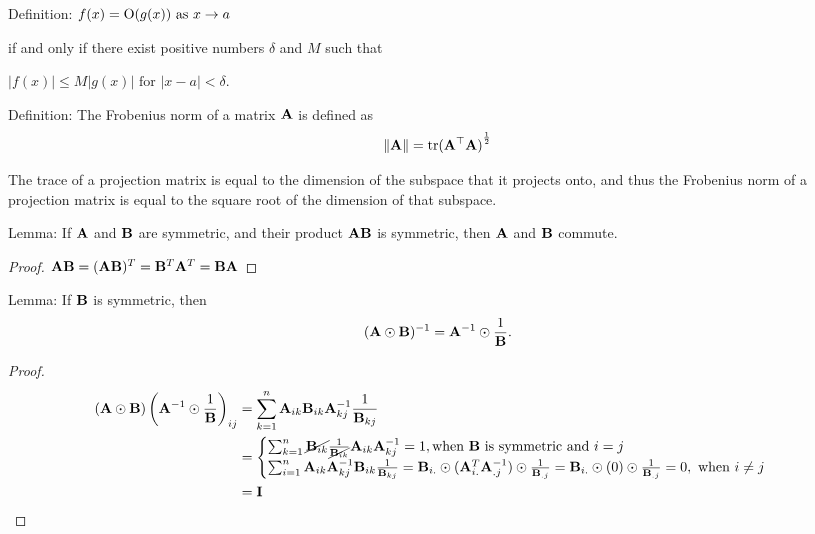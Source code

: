 \documentclass{amsart}[12pt]
\begin{document}
Definition:
$f(x) = \text{O}(g(x)) \text{ as } x \to a$

if and only if there exist positive numbers $\delta$ and $M$ such that

$|f(x)| \leq M |g(x)| \text{ for } |x - a| < \delta$.

Definition:
The Frobenius norm of a matrix ${\bf A}$ is defined as
\begin{align*}
\| {\bf A} \| = \text{tr}{({\bf A}^\top {\bf A})}^{\frac{1}{2}}
\end{align*}

The trace of a projection matrix is equal to the dimension of the subspace that it projects onto, and thus
the Frobenius norm of a projection matrix is equal to the square root of the dimension of that subspace.

Lemma:
If ${\bf A}$ and ${\bf B}$ are symmetric, and their product ${\bf A} {\bf B}$ is symmetric, then ${\bf A}$ and ${\bf B}$ commute.
\begin{proof}
${\bf A} {\bf B} = ({\bf A} {\bf B})^T = {\bf B}^T {\bf A}^T = {\bf B} {\bf A}$
\end{proof}

Lemma:
If ${\bf B}$ is symmetric, then
\[
({\bf A} \odot {\bf B})^{-1} = {\bf A}^{-1} \odot \frac{1}{{\bf B}}.
\]
\begin{proof}
\begin{align*}
({\bf A} \odot {\bf B})\left({\bf A}^{-1} \odot \frac{1}{{\bf B}}\right)_{ij} &= \sum_{k=1}^n {\bf A}_{ik} {\bf B}_{ik} {\bf A}^{-1}_{kj} \frac{1}{{\bf B}_{kj}} \\
&=
\begin{cases}
\sum_{k=1}^n \cancel{{\bf B}_{ik}} \frac{1}{\cancel{{\bf B}_{ik}}} {\bf A}_{ik} {\bf A}^{-1}_{kj} = 1, \text{when ${\bf B}$ is symmetric and $i = j$} \\
\sum_{i=1}^n {\bf A}_{ik} {\bf A}^{-1}_{kj} {\bf B}_{ik} \frac{1}{{\bf B}_{kj}}
= {\bf B}_{i.} \odot ({\bf A}^T_{i.} {\bf A}^{-1}_{.j}) \odot \frac{1}{{\bf B}_{.j}}
= {\bf B}_{i.} \odot (0) \odot \frac{1}{{\bf B}_{.j}}
= 0, \text{ when $i \ne j$}
\end{cases}\\
&= {\bf I}
\end{align*}
\end{proof}
\end{document}
